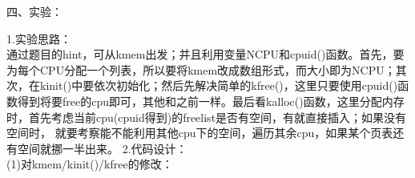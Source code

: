 \documentclass[12pt]{article}
\begin{document}
\begin{large}
    \noindent 四、实验：\\
\end{large}
\noindent 1.实验思路：\\
\hspace*{2em}通过题目的hint，可从kmem出发；并且利用变量NCPU和cpuid()函数。首先，要为每个CPU分配一个列表，所以要将kmem改成数组形式，而大小即为NCPU；其次，在kinit()中要依次初始化；然后先解决简单的kfree()，这里只要使用cpuid()函数得到将要free的cpu即可，其他和之前一样。最后看kalloc()函数，这里分配内存时，首先考虑当前cpu(cpuid得到)的freelist是否有空间，有就直接插入；如果没有空间时，
就要考察能不能利用其他cpu下的空间，遍历其余cpu，如果某个页表还有空间就挪一半出来。
\newpage
\noindent 2.代码设计：\\
(1)对kmem/kinit()/kfree的修改：
\begin{figure}[!h]
    \centering
    \hfill
    \hfill
\end{figure}
\end{document}
